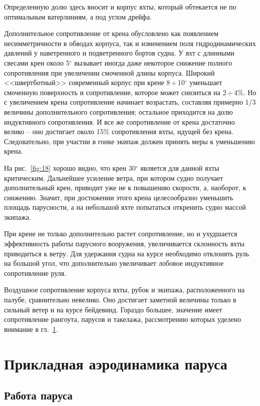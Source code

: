 \documentclass[a4paper, 12pt, twoside, final, book, russian, fittopage, cyremdash]{ncc}
\newcommand{\gr}{\ensuremath{^\circ}\xspace}
\newcommand{\otdo}{\,\ensuremath{\div}\,}
\newcommand{\ris}[1]{\ref{fig:#1}}
\begin{document}
Определенную долю здесь вносит и корпус яхты, который обтекается не по оптимальным ватерлиниям, а под углом дрейфа. 

Дополнительное сопротивление от крена обусловлено как появлением несимметричности в обводах корпуса, так и изменением поля гидродинамических давлений у наветренного и подветренного бортов судна. У яхт с длинными свесами крен около 5\gr вызывает иногда даже некоторое снижение полного сопротивления при увеличении смоченной длины корпуса. Широкий <<швертботный>> современный корпус при крене 8\otdo 10\gr уменьшает смоченную поверхность и сопротивление, которое может снизиться на 2\otdo 4\%. Но с увеличением крена сопротивление начинает возрастать, составляя примерно 1/3 величины дополнительного сопротивления; остальное приходится на долю индуктивного сопротивления. И все же сопротивление от крена достаточно велико \--- оно достигает около 15\% сопротивления яхты, идущей без крена. Следовательно, при участии в гонке экипаж должен принять меры к уменьшению крена.

На рис.~\ris{18} хорошо видно, что крен 30\gr является для данной яхты критическим. Дальнейшее усиление ветра, при котором судно получает дополнительный крен, приводит уже не к повышению скорости, а, наоборот, к снижению. Значит, при достижении этого крена целесообразно уменьшить площадь парусности, а на небольшой яхте попытаться откренить судно массой экипажа.

При крене не только дополнительно растет сопротивление, но и ухудшается эффективность работы парусного вооружения, увеличивается склонность яхты приводиться к ветру. Для удержания судна на курсе необходимо отклонять руль на большой угол, что дополнительно увеличивает лобовое индуктивное сопротивление руля. 

Воздушное сопротивление корпуса яхты, рубок и экипажа, расположенного на палубе, сравнительно невелико. Оно достигает заметной величины только в сильный ветер и на курсе бейдевинд. Гораздо большее, значение имеет сопротивление рангоута, парусов и такелажа, рассмотрению которых уделено внимание в гл.~\ref{chap:2}.

\chapter{Прикладная аэродинамика паруса}\label{chap:2}

\section{Работа паруса}
\end{document}
